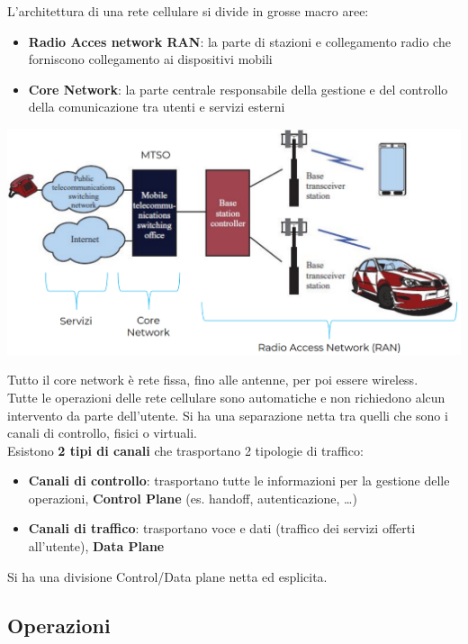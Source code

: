 L'architettura di una rete cellulare si divide in grosse macro aree: 
\begin{itemize}
	\item \textbf{Radio Acces network RAN}: la parte di stazioni e collegamento radio che forniscono collegamento ai dispositivi mobili
	\item \textbf{Core Network}: la parte centrale responsabile della gestione e del controllo della comunicazione tra utenti e servizi esterni
\end{itemize}
\begin{center}
	\includegraphics[width=0.8\linewidth]{img/mobile/archop}
\end{center}
Tutto il core network è rete fissa, fino alle antenne, per poi essere wireless. \\
Tutte le operazioni delle rete cellulare sono automatiche e non richiedono alcun intervento da parte dell'utente. Si ha una separazione netta tra quelli che sono i canali di controllo, fisici o virtuali. \\

Esistono \textbf{2 tipi di canali} che trasportano 2 tipologie di traffico:
\begin{itemize}
	\item \textbf{Canali di controllo}: trasportano tutte le informazioni per la gestione delle operazioni, \textbf{Control Plane} (es. handoff, autenticazione, \dots)
	\item \textbf{Canali di traffico}: trasportano voce e dati (traffico dei servizi offerti all'utente), \textbf{Data Plane}
\end{itemize}
Si ha una divisione Control/Data plane netta ed esplicita.\\

\newpage

\subsection{Operazioni}

